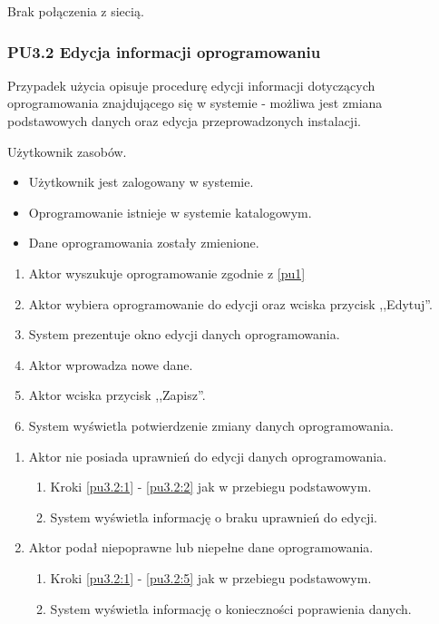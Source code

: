 Brak połączenia z siecią.

\subsubsection{PU3.2 Edycja informacji oprogramowaniu}

Przypadek użycia opisuje procedurę edycji informacji dotyczących oprogramowania znajdującego się w systemie - możliwa jest zmiana podstawowych danych oraz edycja przeprowadzonych instalacji.

Użytkownik zasobów.

\begin{itemize}
\item Użytkownik jest zalogowany w systemie.
\item Oprogramowanie istnieje w systemie katalogowym.
\end{itemize}

\begin{itemize}
\item Dane oprogramowania zostały zmienione.
\end{itemize}

\begin{enumerate}
\item \label{pu3.2:1} Aktor wyszukuje oprogramowanie zgodnie z \ref{pu1}
\item \label{pu3.2:2} Aktor wybiera oprogramowanie do edycji oraz wciska przycisk ,,Edytuj''.
\item System prezentuje okno edycji danych oprogramowania.
\item Aktor wprowadza nowe dane.
\item \label{pu3.2:5} Aktor wciska przycisk ,,Zapisz''.
\item System wyświetla potwierdzenie zmiany danych oprogramowania.
\end{enumerate}

\begin{enumerate}
\item Aktor nie posiada uprawnień do edycji danych oprogramowania.
	\begin{enumerate}[label*=\arabic*.]
		\item Kroki \ref{pu3.2:1} - \ref{pu3.2:2} jak w przebiegu podstawowym.
		\item System wyświetla informację o braku uprawnień do edycji.
	\end{enumerate}
\item Aktor podał niepoprawne lub niepełne dane oprogramowania.
	\begin{enumerate}[label*=\arabic*.]
		\item Kroki \ref{pu3.2:1} - \ref{pu3.2:5} jak w przebiegu podstawowym.
		\item System wyświetla informację o konieczności poprawienia danych.
	\end{enumerate}
\end{enumerate}

